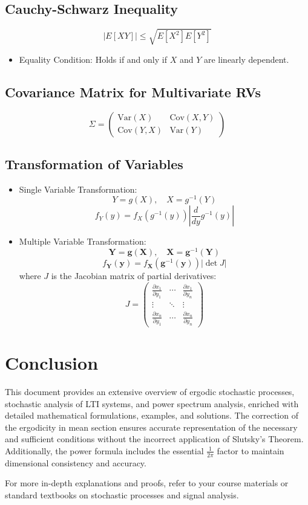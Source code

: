 \documentclass[12pt]{article}
\begin{document}
\subsection{Cauchy-Schwarz Inequality}
\[
|E[XY]| \leq \sqrt{E[X^2] E[Y^2]}
\]
\begin{itemize}
    \item Equality Condition: Holds if and only if \( X \) and \( Y \) are linearly dependent.
\end{itemize}

\subsection{Covariance Matrix for Multivariate RVs}
\[
\Sigma = 
\begin{pmatrix}
\text{Var}(X) & \text{Cov}(X,Y) \\
\text{Cov}(Y,X) & \text{Var}(Y)
\end{pmatrix}
\]

\subsection{Transformation of Variables}
\begin{itemize}
    \item Single Variable Transformation:
    \[
    Y = g(X), \quad X = g^{-1}(Y)
    \]
    \[
    f_Y(y) = f_X(g^{-1}(y)) \left| \frac{d}{dy} g^{-1}(y) \right|
    \]
    \item Multiple Variable Transformation:
    \[
    \mathbf{Y} = \mathbf{g}(\mathbf{X}), \quad \mathbf{X} = \mathbf{g}^{-1}(\mathbf{Y})
    \]
    \[
    f_{\mathbf{Y}}(\mathbf{y}) = f_{\mathbf{X}}(\mathbf{g}^{-1}(\mathbf{y})) \left| \det J \right|
    \]
    where \( J \) is the Jacobian matrix of partial derivatives:
    \[
    J = 
    \begin{pmatrix}
    \frac{\partial x_1}{\partial y_1} & \cdots & \frac{\partial x_1}{\partial y_n} \\
    \vdots & \ddots & \vdots \\
    \frac{\partial x_n}{\partial y_1} & \cdots & \frac{\partial x_n}{\partial y_n}
    \end{pmatrix}
    \]
\end{itemize}

\section{Conclusion}

This document provides an extensive overview of ergodic stochastic processes, stochastic analysis of LTI systems, and power spectrum analysis, enriched with detailed mathematical formulations, examples, and solutions. The correction of the ergodicity in mean section ensures accurate representation of the necessary and sufficient conditions without the incorrect application of Slutsky's Theorem. Additionally, the power formula includes the essential \( \frac{1}{2\pi} \) factor to maintain dimensional consistency and accuracy.

For more in-depth explanations and proofs, refer to your course materials or standard textbooks on stochastic processes and signal analysis.
\end{document}

